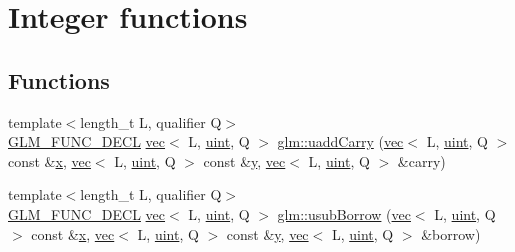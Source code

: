 \hypertarget{group__core__func__integer}{}\section{Integer functions}
\label{group__core__func__integer}
\subsection*{Functions}
\begin{DoxyCompactItemize}
\item 
{\footnotesize template$<$length\+\_\+t L, qualifier Q$>$ }\\\mbox{\hyperlink{setup_8hpp_ab2d052de21a70539923e9bcbf6e83a51}{G\+L\+M\+\_\+\+F\+U\+N\+C\+\_\+\+D\+E\+CL}} \mbox{\hyperlink{structglm_1_1vec}{vec}}$<$ L, \mbox{\hyperlink{group__core__precision_ga4fd29415871152bfb5abd588334147c8}{uint}}, Q $>$ \mbox{\hyperlink{group__core__func__integer_gaedcec48743632dff6786bcc492074b1b}{glm\+::uadd\+Carry}} (\mbox{\hyperlink{structglm_1_1vec}{vec}}$<$ L, \mbox{\hyperlink{group__core__precision_ga4fd29415871152bfb5abd588334147c8}{uint}}, Q $>$ const \&\mbox{\hyperlink{_s_d_l__opengl_8h_ad0e63d0edcdbd3d79554076bf309fd47}{x}}, \mbox{\hyperlink{structglm_1_1vec}{vec}}$<$ L, \mbox{\hyperlink{group__core__precision_ga4fd29415871152bfb5abd588334147c8}{uint}}, Q $>$ const \&\mbox{\hyperlink{_s_d_l__opengl_8h_a1675d9d7bb68e1657ff028643b4037e3}{y}}, \mbox{\hyperlink{structglm_1_1vec}{vec}}$<$ L, \mbox{\hyperlink{group__core__precision_ga4fd29415871152bfb5abd588334147c8}{uint}}, Q $>$ \&carry)
\item 
{\footnotesize template$<$length\+\_\+t L, qualifier Q$>$ }\\\mbox{\hyperlink{setup_8hpp_ab2d052de21a70539923e9bcbf6e83a51}{G\+L\+M\+\_\+\+F\+U\+N\+C\+\_\+\+D\+E\+CL}} \mbox{\hyperlink{structglm_1_1vec}{vec}}$<$ L, \mbox{\hyperlink{group__core__precision_ga4fd29415871152bfb5abd588334147c8}{uint}}, Q $>$ \mbox{\hyperlink{group__core__func__integer_gae3316ba1229ad9b9f09480833321b053}{glm\+::usub\+Borrow}} (\mbox{\hyperlink{structglm_1_1vec}{vec}}$<$ L, \mbox{\hyperlink{group__core__precision_ga4fd29415871152bfb5abd588334147c8}{uint}}, Q $>$ const \&\mbox{\hyperlink{_s_d_l__opengl_8h_ad0e63d0edcdbd3d79554076bf309fd47}{x}}, \mbox{\hyperlink{structglm_1_1vec}{vec}}$<$ L, \mbox{\hyperlink{group__core__precision_ga4fd29415871152bfb5abd588334147c8}{uint}}, Q $>$ const \&\mbox{\hyperlink{_s_d_l__opengl_8h_a1675d9d7bb68e1657ff028643b4037e3}{y}}, \mbox{\hyperlink{structglm_1_1vec}{vec}}$<$ L, \mbox{\hyperlink{group__core__precision_ga4fd29415871152bfb5abd588334147c8}{uint}}, Q $>$ \&borrow)

\end{DoxyCompactItemize}
